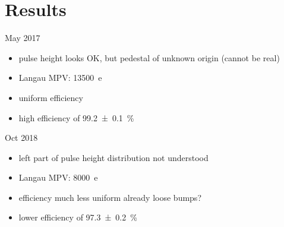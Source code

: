 \section{Results}
\begin{frame}{May 2017}

	
	\begin{itemize}\itemfill
		\item<1-> pulse height looks OK, but pedestal of unknown origin (cannot be real)
		\item<1-> Langau MPV: \SI{13500}{e}
		\item<1-> uniform efficiency
		\item<2> high efficiency of \SI{99.2\pm.1}{\%}
	\end{itemize}
	
\end{frame}
\begin{frame}{Oct 2018}

	
	\begin{itemize}\itemfill
		\item<1-> left part of pulse height distribution not understood
		\item<1-> Langau MPV: \SI{8000}{e}
		\item<1-> efficiency much less uniform \ra already loose bumps?
		\item<2> lower efficiency of \SI{97.3\pm.2}{\%}
	\end{itemize}
	
\end{frame}
